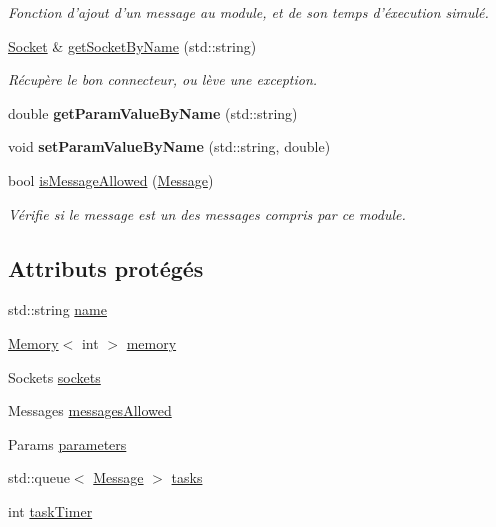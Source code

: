 \begin{DoxyCompactItemize}
\begin{DoxyCompactList}\small\item\em Fonction d'ajout d'un message au module, et de son temps d'éxecution simulé. \end{DoxyCompactList}\item 
\hyperlink{classSocket}{Socket} \& \hyperlink{classModule_a818c5fc693a7ea20db6a2245e94f6561}{get\-Socket\-By\-Name} (std\-::string)
\begin{DoxyCompactList}\small\item\em Récupère le bon connecteur, ou lève une exception. \end{DoxyCompactList}\item 
\hypertarget{classModule_a93e2ee84587751939c1fd31cb0802e41}{double {\bfseries get\-Param\-Value\-By\-Name} (std\-::string)}\label{classModule_a93e2ee84587751939c1fd31cb0802e41}

\item 
\hypertarget{classModule_ace0e4299e1a6f9b46aa9fd316483895d}{void {\bfseries set\-Param\-Value\-By\-Name} (std\-::string, double)}\label{classModule_ace0e4299e1a6f9b46aa9fd316483895d}

\item 
\hypertarget{classModule_ac37dde7b4cbe2ea7b319cd43282296ac}{bool \hyperlink{classModule_ac37dde7b4cbe2ea7b319cd43282296ac}{is\-Message\-Allowed} (\hyperlink{classMessage}{Message})}\label{classModule_ac37dde7b4cbe2ea7b319cd43282296ac}

\begin{DoxyCompactList}\small\item\em Vérifie si le message est un des messages compris par ce module. \end{DoxyCompactList}\end{DoxyCompactItemize}
\subsection*{Attributs protégés}
\begin{DoxyCompactItemize}
\item 
std\-::string \hyperlink{classModule_a794fbb44972c7c73cc197159093e66d1}{name}
\item 
\hyperlink{classMemory}{Memory}$<$ int $>$ \hyperlink{classModule_a48fa02fe55d33daffff725c615a63bb9}{memory}
\item 
Sockets \hyperlink{classModule_af0415ddaab230958f91665c66b078085}{sockets}
\item 
Messages \hyperlink{classModule_aaadd1f971bebf7bb5eae12fcc5689198}{messages\-Allowed}
\item 
Params \hyperlink{classModule_a232443111a9d59c17724992ddf75fbad}{parameters}
\item 
std\-::queue$<$ \hyperlink{classMessage}{Message} $>$ \hyperlink{classModule_aeace7c2bfd88f9946a25fb06974ca522}{tasks}
\item 
int \hyperlink{classModule_afc209c4f9120425219f7775c79cf4bea}{task\-Timer}
\end{DoxyCompactItemize}


